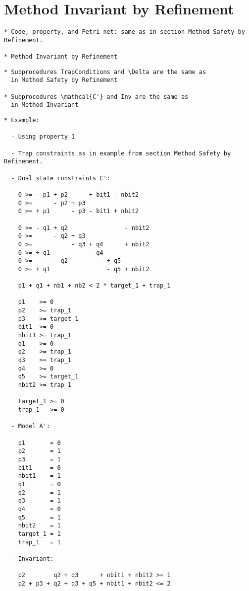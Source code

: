 \section{Method Invariant by Refinement}

\begin{verbatim}
* Code, property, and Petri net: same as in section Method Safety by Refinement.

* Method Invariant by Refinement
\end{verbatim}




\begin{verbatim}
* Subprocedures TrapConditions and \Delta are the same as
  in Method Safety by Refinement

* Subprocedures \mathcal{C'} and Inv are the same as
  in Method Invariant
\end{verbatim}

\newpage

\begin{verbatim}
* Example:

  - Using property 1

  - Trap constraints as in example from section Method Safety by Refinement.
  
  - Dual state constraints C':

    0 >= - p1 + p2      + bit1 - nbit2
    0 >=      - p2 + p3
    0 >= + p1      - p3 - bit1 + nbit2

    0 >= - q1 + q2                - nbit2
    0 >=      - q2 + q3
    0 >=           - q3 + q4      + nbit2
    0 >= + q1           - q4
    0 >=      - q2           + q5
    0 >= + q1                - q5 + nbit2

    p1 + q1 + nb1 + nb2 < 2 * target_1 + trap_1

    p1    >= 0
    p2    >= trap_1
    p3    >= target_1
    bit1  >= 0
    nbit1 >= trap_1
    q1    >= 0
    q2    >= trap_1
    q3    >= trap_1
    q4    >= 0
    q5    >= target_1
    nbit2 >= trap_1

    target_1 >= 0
    trap_1   >= 0

  - Model A':

    p1       = 0
    p2       = 1
    p3       = 1
    bit1     = 0
    nbit1    = 1
    q1       = 0
    q2       = 1
    q3       = 1
    q4       = 0
    q5       = 1
    nbit2    = 1
    target_1 = 1
    trap_1   = 1
    
  - Invariant:

    p2        q2 + q3      + nbit1 + nbit2 >= 1
    p2 + p3 + q2 + q3 + q5 + nbit1 + nbit2 <= 2

\end{verbatim}
